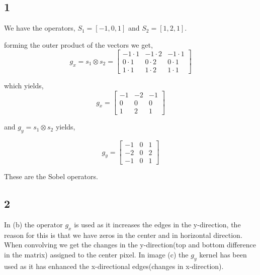 {\subsection{1}

We have the operators, $S_{1} = [-1,0,1]$ and $S_{2} = [1,2,1]$.

forming the outer product of the vectors we get,
\begin{equation*}
    g_{x} = s_{1}\otimes s_{2} =     \begin{bmatrix}
        -1\cdot1       & -1\cdot2 & -1\cdot1 \\
         0\cdot1 & 0\cdot2 & 0\cdot1 \\
        1\cdot1 & 1\cdot2 & 1\cdot1
    \end{bmatrix}
\end{equation*}

which yields,
\begin{equation}
    g_{x}  = \begin{bmatrix}
        -1       & -2 & -1 \\
         0 & 0 & 0 \\
        1 & 2 & 1
    \end{bmatrix}
\end{equation}

and $g_{y} = s_{1}\otimes s_{2}$ yields,

\begin{equation}
    g_{y}  = \begin{bmatrix}
        -1       & 0 & 1 \\
         -2 & 0 & 2 \\
        -1 & 0 & 1
    \end{bmatrix}
\end{equation}

These are the Sobel operators.
\subsection{2}

In (b) the operator $g_{x}$ is used as it increases the edges in the y-direction, the reason for this is that we have zeros in the center and in horizontal direction. When convolving we get the changes in the y-direction(top and bottom difference in the matrix) assigned to the center pixel. In image (c) the $g_{y}$ kernel has been used as it has enhanced the x-directional edges(changes in x-direction).


}
